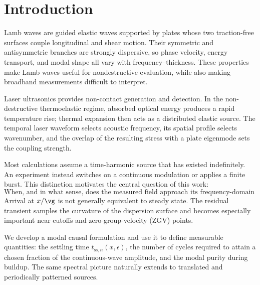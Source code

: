 \section{Introduction}

Lamb waves are guided elastic waves supported by plates whose two traction-free
surfaces couple longitudinal and shear motion. Their symmetric and antisymmetric
branches are strongly dispersive, so phase velocity, energy transport, and modal
shape all vary with frequency--thickness. These properties make Lamb waves useful
for nondestructive evaluation, while also making broadband measurements difficult
to interpret.

Laser ultrasonics provides non-contact generation and detection. In the
non-destructive thermoelastic regime, absorbed optical energy produces a rapid
temperature rise; thermal expansion then acts as a distributed elastic source.
The temporal laser waveform selects acoustic frequency, its spatial profile
selects wavenumber, and the overlap of the resulting stress with a plate
eigenmode sets the coupling strength.

Most calculations assume a time-harmonic source that has existed indefinitely.
An experiment instead switches on a continuous modulation or applies a finite
burst. This distinction motivates the central question of this work:
\begin{equation}
  \text{When, and in what sense, does the measured field approach its
  frequency-domain prediction?}
\end{equation}
Arrival at $x/\vg$ is not generally equivalent to steady state. The residual
transient samples the curvature of the dispersion surface and becomes especially
important near cutoffs and zero-group-velocity (ZGV) points.

We develop a modal causal formulation and use it to define measurable quantities:
the settling time $t_{\mathrm{ss},n}(x,\epsilon)$, the number of cycles required
to attain a chosen fraction of the continuous-wave amplitude, and the modal
purity during buildup. The same spectral picture naturally extends to translated
and periodically patterned sources.

